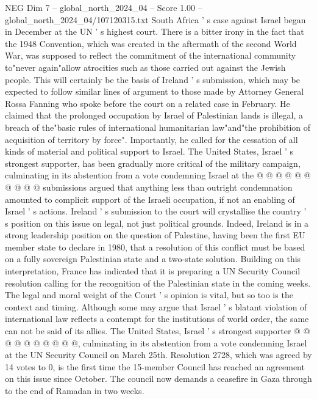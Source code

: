 \begin{textsample}{NEG Dim 7 – global\_north\_2024\_04 – Score 1.00 – global\_north\_2024\_04/107120315.txt}  \label{ex:f7_neg_389}
South Africa ' s case against Israel began in December at the UN ' s highest court.
There is a bitter irony in the fact that the 1948 Convention, which was created in the aftermath of the second World War, was supposed to reflect the commitment of the international community to"never again"allow atrocities such as those carried out against the Jewish people.
This will certainly be the basis of Ireland ' s submission, which may be expected to follow similar lines of argument to those made by Attorney General Rossa Fanning who spoke before the court on a related case in February.
He claimed that the prolonged occupation by Israel of Palestinian lands is illegal, a breach of the"basic rules of international humanitarian law"and"the prohibition of acquisition of territory by force".
Importantly, he called for the cessation of all kinds of material and political support to Israel.
The United States, Israel ' s strongest supporter, has been gradually more critical of the military campaign, culminating in its abstention from a vote condemning Israel at the @ @ @ @ @ @ @ @ @ @ submissions argued that anything less than outright condemnation amounted to complicit support of the Israeli occupation, if not an enabling of Israel ' s actions.
Ireland ' s submission to the court will crystallise the country ' s position on this issue on legal, not just political grounds.
Indeed, Ireland is in a strong leadership position on the question of Palestine, having been the first EU member state to declare in 1980, that a resolution of this conflict must be based on a fully sovereign Palestinian state and a two-state solution.
Building on this interpretation, France has indicated that it is preparing a UN Security Council resolution calling for the recognition of the Palestinian state in the coming weeks.
The legal and moral weight of the Court ' s opinion is vital, but so too is the context and timing.
Although some may argue that Israel ' s blatant violation of international law reflects a contempt for the institutions of world order, the same can not be said of its allies.
The United States, Israel ' s strongest supporter @ @ @ @ @ @ @ @ @ @, culminating in its abstention from a vote condemning Israel at the UN Security Council on March 25th.
Resolution 2728, which was agreed by 14 votes to 0, is the first time the 15-member Council has reached an agreement on this issue since October.
The council now demands a ceasefire in Gaza through to the end of Ramadan in two weeks.

\end{textsample}
